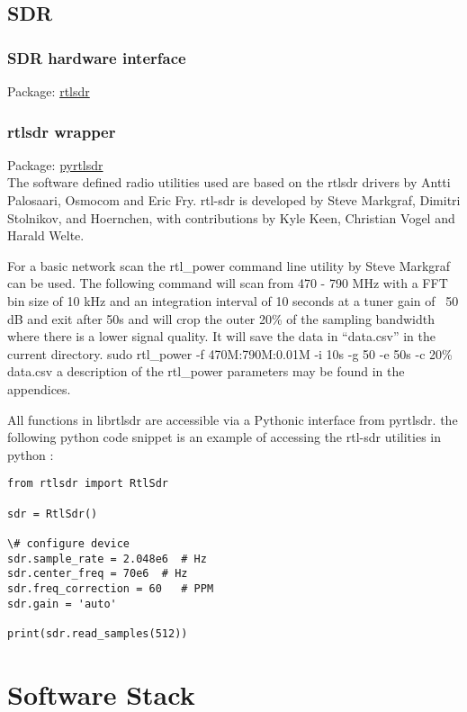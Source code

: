 \subsection{SDR}
\subsubsection{SDR hardware interface}
Package:	\href{https://github.com/steve-m/librtlsdr}{rtlsdr}\\

\subsubsection{rtlsdr wrapper}
Package:	\href{https://github.com/roger-/pyrtlsdr}{pyrtlsdr}\\
The software defined radio utilities used are based on the rtlsdr drivers by Antti Palosaari, Osmocom and Eric Fry. rtl-sdr is developed by Steve Markgraf, Dimitri Stolnikov, and Hoernchen, with contributions by Kyle Keen, Christian Vogel and Harald Welte.

For a basic network scan the rtl_power command line utility by Steve Markgraf can be used. The following command will scan from 470 - 790 MHz with a FFT bin size of 10 kHz and an integration interval of 10 seconds at a tuner gain of ~50 dB and exit after 50s and will crop the outer 20\% of the sampling bandwidth where there is a lower signal quality. It will save the data in “data.csv” in the current directory.
sudo rtl_power -f 470M:790M:0.01M -i 10s -g 50 -e 50s -c 20\%  data.csv
a description of the rtl_power parameters may be found in the appendices.

All functions in librtlsdr are accessible via a Pythonic interface from pyrtlsdr.
the following python code snippet is an example of accessing the rtl-sdr utilities in python :

\begin{lstlisting}
from rtlsdr import RtlSdr

sdr = RtlSdr()

\# configure device
sdr.sample_rate = 2.048e6  # Hz
sdr.center_freq = 70e6 	# Hz
sdr.freq_correction = 60   # PPM
sdr.gain = 'auto'

print(sdr.read_samples(512))
\end{lstlisting}



\section{Software Stack}

    
    
    
    
    
    
    